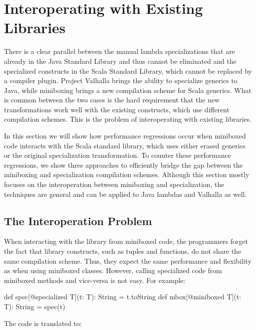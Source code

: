 \section{Interoperating with Existing Libraries}
\label{sec:library}

There is a clear parallel between the manual lambda specializations that are already in the Java Standard Library and thus cannot be eliminated and the specialized constructs in the Scala Standard Library, which cannot be replaced by a compiler plugin. Project Valhalla brings the ability to specialize generics to Java, while miniboxing brings a new compilation scheme for Scala generics. What is common between the two cases is the hard requirement that the new transformations work well with the existing constructs, which use different compilation schemes. This is the problem of interoperating with existing libraries.

In this section we will show how performance regressions occur when miniboxed code interacts with the Scala standard library, which uses either erased generics or the original specialization transformation. To counter these performance regressions, we show three approaches to efficiently bridge the gap between the miniboxing and specialization compilation schemes. Although this section mostly focuses on the interoperation between miniboxing and specialization, the techniques are general and can be applied to Java lambdas and Valhalla as well.

\subsection{The Interoperation Problem}

When interacting with the library from miniboxed code, the programmers forget the fact that library constructs, such as tuples and functions, do not share the same compilation scheme. Thus, they expect the same performance and flexibility as when using miniboxed classes. However, calling specialized code from miniboxed methods and vice-versa is not easy. For example:

\begin{lstlisting-nobreak}
 def spec[@specialized T](t: T): String = t.toString
 def mbox[@miniboxed T](t: T): String = spec(t)
\end{lstlisting-nobreak}

\vspace{-0.2em}

The code is translated to:

